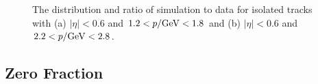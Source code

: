 \begin{figure}[htbp]
\centering
{}
\caption{The \ep distribution and ratio of simulation to data for isolated tracks with (a) $|\eta| < 0.6$ and $1.2 < p /\mathrm{Ge\kern -0.05em V} < 1.8$ and (b) $|\eta| < 0.6$ and $2.2 < p /\mathrm{Ge\kern -0.05em V} < 2.8$.}

\label{fig:eoverp}
\end{figure}

\subsection{Zero Fraction}
\label{sec:zero_fraction}

